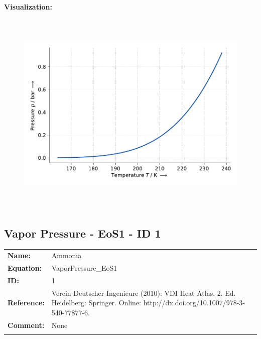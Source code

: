 \textbf{Visualization:}
%
\begin{figure}[!htp]
{\noindent\includegraphics[height=10cm, keepaspectratio]{figs/ref/ref_Ammonia_VaporPressure_Antoine_2.pdf}}
\end{figure}
%

\FloatBarrier
\newpage
\subsection{Vapor Pressure - EoS1 - ID 1}
%
\begin{tabular}[l]{|lp{11.5cm}|}
\hline
\addlinespace

\textbf{Name:} & Ammonia \\
\textbf{Equation:} & VaporPressure\_EoS1 \\
\textbf{ID:} & 1 \\
\textbf{Reference:} & Verein Deutscher Ingenieure (2010): VDI Heat Atlas. 2. Ed. Heidelberg: Springer. Online: http://dx.doi.org/10.1007/978-3-540-77877-6. \\
\textbf{Comment:} & None \\

\addlinespace
\hline
\end{tabular}
\newline

